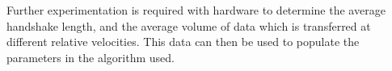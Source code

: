 
Further experimentation is required with hardware to determine the average handshake length, and the average volume of data which is transferred at different relative velocities. This data can then be used to populate the parameters in the algorithm used. 







